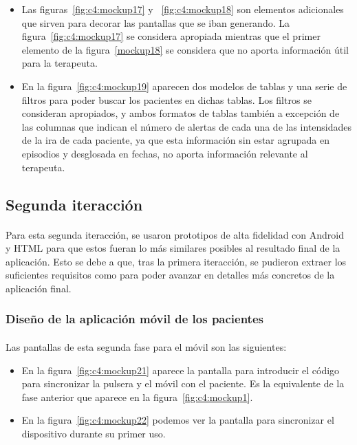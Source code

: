 \begin{itemize}
    \item Las figuras~\ref{fig:c4:mockup17} y ~\ref{fig:c4:mockup18} son elementos adicionales que sirven para decorar las pantallas que se iban generando. La figura~\ref{fig:c4:mockup17} se considera apropiada mientras que el primer elemento de la figura~\ref{mockup18} se considera que no aporta información útil para la terapeuta.
    \item En la figura~\ref{fig:c4:mockup19} aparecen dos modelos de tablas y una serie de filtros para poder buscar los pacientes en dichas tablas. Los filtros se consideran apropiados, y ambos formatos de tablas también a excepción de las columnas que indican el número de alertas de cada una de las intensidades de la ira de cada paciente, ya que esta información sin estar agrupada en episodios y desglosada en fechas, no aporta información relevante al terapeuta.
\end{itemize}

\subsection{Segunda iteracción}

\paragraph{}
Para esta segunda iteracción, se usaron prototipos de alta fidelidad con Android y HTML para que estos fueran lo más similares posibles al resultado final de la aplicación. Esto se debe a que, tras la primera iteracción, se pudieron extraer los suficientes requisitos como para poder avanzar en detalles más concretos de la aplicación final.

\subsubsection{Diseño de la aplicación móvil de los pacientes}

\paragraph{}
Las pantallas de esta segunda fase para el móvil son las siguientes:

\begin{itemize}
    \item En la figura~\ref{fig:c4:mockup21} aparece la pantalla para introducir el código para sincronizar la pulsera y el móvil con el paciente. Es la equivalente de la fase anterior que aparece en la figura~\ref{fig:c4:mockup1}.
    \item En la figura~\ref{fig:c4:mockup22} podemos ver la pantalla para sincronizar el dispositivo durante su primer uso.
\end{itemize}

